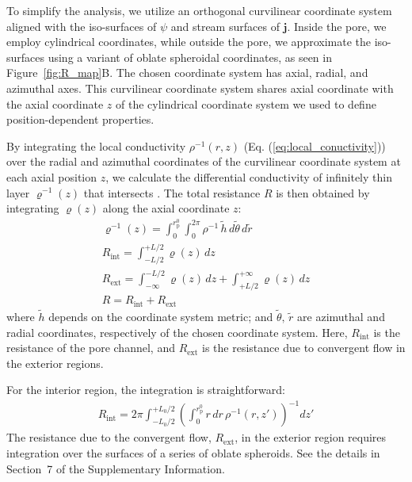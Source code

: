 \documentclass[12pt, a4paper]{article}
\begin{document}
To simplify the analysis, we utilize an orthogonal curvilinear coordinate system aligned with the iso-surfaces of $\psi$ and stream surfaces of $\bm{j}$.
Inside the pore, we employ cylindrical coordinates, while outside the pore, we approximate the iso-surfaces using a variant of oblate spheroidal coordinates, as seen in Figure~\ref{fig:R_map}B. The chosen coordinate system has axial, radial, and azimuthal axes.
This curvilinear coordinate system shares axial coordinate with the axial coordinate $z$ of the cylindrical coordinate system we used to define position-dependent properties.

By integrating the local conductivity $\rho^{-1}(r,z)$ (Eq. (\ref{eq:local_conuctivity})) over the radial and azimuthal coordinates of the curvilinear coordinate system at each axial position $z$, we calculate the differential conductivity of infinitely thin layer $\varrho^{-1}(z)$ that intersects .
The total resistance $R$ is then obtained by integrating $\varrho(z)$ along the axial coordinate $z$:
\begin{eqnarray}
    \label{eq:R_z_inv}
    \varrho^{-1}(z) = \int_{0}^{r_{\text{p}}^{0}}\int_{0}^{2\pi}\rho^{-1} \, \tilde{h} \, d\tilde{\theta} \, d\tilde{r}\\
    \label{eq:R_z_pore}
    R_{\text{int}} = \int_{-L/2}^{+L/2} \varrho(z) \, dz\\
    \label{eq:R_z_conv}
    R_{\text{ext}} = \int_{-\infty}^{-L/2} \varrho(z) \, dz + \int_{+L/2}^{+\infty} \varrho(z) \, dz\\
    \label{eq:R_z_tot}
    R = R_{\text{int}} + R_{\text{ext}}
\end{eqnarray}
where $\tilde{h}$ depends on the coordinate system metric; and $\tilde{\theta}, \, \tilde{r}$ are azimuthal and radial coordinates, respectively of the chosen coordinate system.
Here, $R_{\text{int}}$ is the resistance of the pore channel, and $R_{\text{ext}}$ is the resistance due to convergent flow in the exterior regions.



For the interior region, the integration is straightforward:
\begin{eqnarray}
    R_{\text{int}} = 2\pi\int_{-L_{0}/2}^{+L_{0}/2}\left(\int_{0}^{r_{\text{p}}^{0}} r \, dr \, \rho^{-1}(r, z')\right)^{-1} dz'
    \label{eq:R_pore}
\end{eqnarray}
The resistance due to the convergent flow, $R_{\text{ext}}$, in the exterior region requires integration over the surfaces of a series of oblate spheroids.
See the details in Section~7 of the Supplementary Information.
\end{document}
